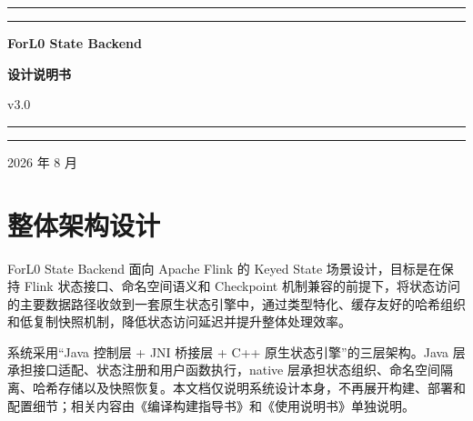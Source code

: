 \documentclass[a4paper,11pt]{article}
\newcommand{\project}{ForL0 State Backend}
\newcommand{\coverrule}{{\color{accent}\rule{\linewidth}{0.9pt}}}
\newcommand{\coverrulethin}{{\color{accent!55}\rule{\linewidth}{0.3pt}}}
\begin{document}
\begin{titlepage}
\thispagestyle{empty}
\centering
\vspace*{5.5cm}

\coverrule
\vspace{2pt}
\coverrulethin

\vspace{1.6cm}
{\sffamily\huge\bfseries\color{accent} \project\par}
\vspace{0.8cm}
{\sffamily\LARGE\bfseries 设计说明书\par}

\vspace{0.6cm}
{\sffamily\large v3.0\par}

\vspace{1.6cm}
\coverrulethin
\vspace{2pt}
\coverrule

\vfill

{\sffamily\large\color{accent!85} 2026 年 8 月\par}

\vspace{1.2cm}
\end{titlepage}

\pagestyle{plain}
\tableofcontents
\clearpage
{}
\setcounter{page}{1}
\pagestyle{fancy}

\section{整体架构设计}

\project{} 面向 Apache Flink 的 Keyed State 场景设计，目标是在保持 Flink 状态接口、命名空间语义和 Checkpoint 机制兼容的前提下，将状态访问的主要数据路径收敛到一套原生状态引擎中，通过类型特化、缓存友好的哈希组织和低复制快照机制，降低状态访问延迟并提升整体处理效率。

系统采用“Java 控制层 + JNI 桥接层 + C++ 原生状态引擎”的三层架构。Java 层承担接口适配、状态注册和用户函数执行，native 层承担状态组织、命名空间隔离、哈希存储以及快照恢复。本文档仅说明系统设计本身，不再展开构建、部署和配置细节；相关内容由《编译构建指导书》和《使用说明书》单独说明。
\end{document}
